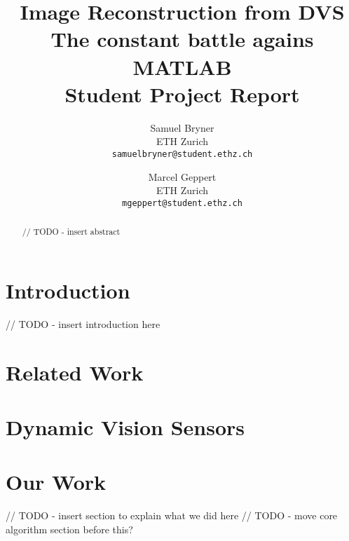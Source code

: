 \documentclass[10pt,twocolumn,letterpaper]{article}
\begin{document}
\title{Image Reconstruction from DVS\\ The constant battle agains MATLAB\\ Student Project Report}

\author{Samuel Bryner\\
ETH Zurich\\
{\tt\small samuelbryner@student.ethz.ch}
\and
Marcel Geppert\\
ETH Zurich\\
{\tt\small mgeppert@student.ethz.ch}
}

\maketitle

\begin{abstract}

// TODO - insert abstract

\end{abstract}

\section{Introduction}
\label{sec:introduction}
// TODO - insert introduction here

\section{Related Work}
\label{sec:related_work}


\section{Dynamic Vision Sensors}
\label{sec:dvs}


\section{Our Work}
\label{sec:our_work}
// TODO - insert section to explain what we did here
// TODO - move core algorithm section before this?
\end{document}
